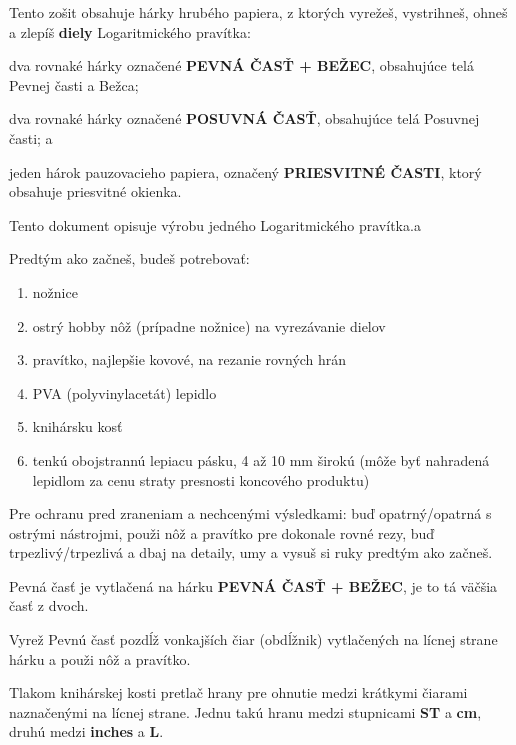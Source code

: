   \begin{multicols*}{3}
  \footnotesize Tento zošit obsahuje hárky hrubého papiera, z ktorých vyrežeš, vystrihneš, ohneš a zlepíš \textbf{diely} Logaritmického pravítka:
    \begin{inparaenum}
      \item dva rovnaké hárky označené \textbf{PEVNÁ ČASŤ + BEŽEC}, obsahujúce telá Pevnej časti a Bežca;
      \item dva rovnaké hárky označené \textbf{POSUVNÁ ČASŤ}, obsahujúce telá Posuvnej časti; a
      \item jeden hárok pauzovacieho papiera, označený \textbf{PRIESVITNÉ ČASTI}, ktorý obsahuje priesvitné okienka.
    \end{inparaenum}

  Tento dokument opisuje výrobu jedného Logaritmického pravítka.a

  \normalsize{Predtým ako začneš, budeš potrebovať:
    \begin{enumerate}
      \setlength{\parskip}{0pt}
      \setlength{\parsep}{0pt}
      \item nožnice
      \item ostrý hobby nôž (prípadne nožnice) na vyrezávanie dielov
      \item pravítko, najlepšie kovové, na rezanie rovných hrán
      \item PVA (polyvinylacetát) lepidlo
      \item knihársku kosť
      \item tenkú obojstrannú lepiacu pásku, 4 až 10 mm širokú (môže byť nahradená lepidlom za cenu straty presnosti koncového produktu)
    \end{enumerate}

  Pre ochranu pred zraneniam a nechcenými výsledkami:
      buď opatrný/opatrná s ostrými nástrojmi,
      použi nôž a pravítko pre dokonale rovné rezy,
      buď trpezlivý/trpezlivá a dbaj na detaily,
      umy a vysuš si ruky predtým ako začneš.


\footnotesize Pevná časť je vytlačená na hárku \textbf{PEVNÁ ČASŤ + BEŽEC}, je to tá väčšia časť z dvoch.\normalsize

Vyrež Pevnú časť pozdĺž vonkajších čiar (obdĺžnik) vytlačených na lícnej strane hárku a použi nôž a pravítko.

Tlakom knihárskej kosti pretlač hrany pre ohnutie medzi krátkymi čiarami naznačenými na lícnej strane. Jednu takú hranu medzi stupnicami \textbf{ST} a \textbf{cm}, druhú medzi \textbf{inches} a \textbf{L}.

}
\end{multicols*}
